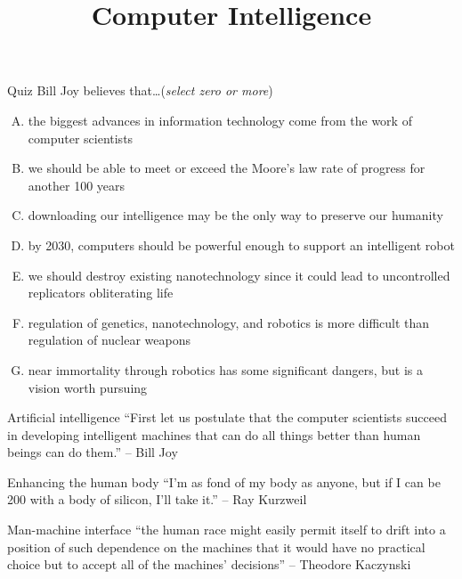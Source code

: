 \documentclass{beamer}
\title{Computer Intelligence}
\date{}
\begin{document}
\begin{frame}
\titlepage
\end{frame}

\begin{frame}{Quiz}
Bill Joy believes that\ldots \hfill (\emph{select zero or more})
\begin{enumerate}[(A)]
\item<1> the biggest advances in information technology come from the work of computer scientists %
\item<1> we should be able to meet or exceed the Moore's law rate of progress for another 100 years %
\item<1> downloading our intelligence may be the only way to preserve our humanity %
\item<1-2> by 2030, computers should be powerful enough to support an intelligent robot
\item<1> we should destroy existing nanotechnology since it could lead to uncontrolled replicators obliterating life %
\item<1-2> regulation of genetics, nanotechnology, and robotics is more difficult than regulation of nuclear weapons %
\item<1> near immortality through robotics has some significant dangers, but is a vision worth pursuing
\end{enumerate}
\end{frame}

\begin{frame}{Artificial intelligence}
``First let us postulate that the computer scientists succeed in developing intelligent machines that can do all things better than human beings can do them.'' -- Bill Joy \\
\bigskip
\href{http://www.npr.org/player/v2/mediaPlayer.html?action=1&t=1&islist=false&id=155792609&m=155798855}{}
\end{frame}

\begin{frame}{Enhancing the human body}
``I'm as fond of my body as anyone, but if I can be 200 with a body of silicon, I'll take it.'' -- Ray Kurzweil \\
\bigskip
\href{http://www.youtube.com/watch?v=mO0xNI3xpmE}{}
\end{frame}

\begin{frame}{Man-machine interface}
``the human race might easily permit itself to drift into a position of such dependence on the machines that it would have no practical choice but to accept all of the machines' decisions'' -- Theodore Kaczynski \\
\bigskip
\href{https://www.youtube.com/watch?v=ogBX18maUiM}{}
\end{frame}
\end{document}
